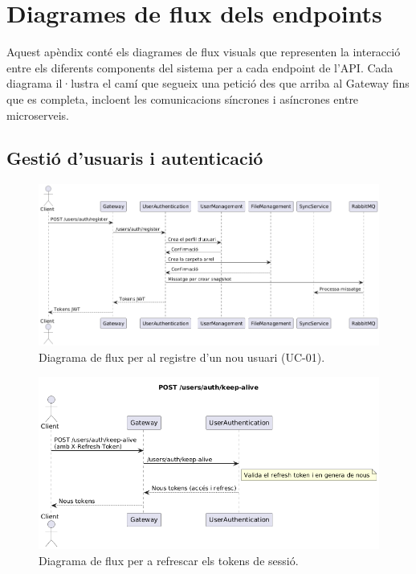 
\chapter{Diagrames de flux dels endpoints}
\label{app:diagrames_flux}

Aquest apèndix conté els diagrames de flux visuals que representen la interacció entre els diferents components del sistema per a cada endpoint de l'API. Cada diagrama il·lustra el camí que segueix una petició des que arriba al Gateway fins que es completa, incloent les comunicacions síncrones i asíncrones entre microserveis.

\section{Gestió d'usuaris i autenticació}

\begin{figure}[H]
    \centering
    \includegraphics[width=1\textwidth]{Figures/flux/register_user.png}
    \caption{Diagrama de flux per al registre d'un nou usuari (UC-01).}
    \label{fig:flow_register_user}
\end{figure}

\begin{figure}[H]
    \centering
    \includegraphics[width=1\textwidth]{Figures/flux/refresh_tokens.png}
    \caption{Diagrama de flux per a refrescar els tokens de sessió.}
    \label{fig:flow_refresh_tokens}
\end{figure}

